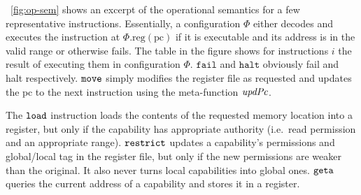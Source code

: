\documentclass[acmsmall,review]{acmart}\settopmatter{printfolios=true}
\newcommand{\update}[2]{[#1 \mapsto #2]}
\newcommand{\sem}[1]{\left\llbracket #1 \right\rrbracket}
\newcommand{\var}[1]{\mathit{#1}}
\newcommand{\lv}{\var{r}}
\newcommand{\gl}{\var{g}}
\newcommand{\pcreg}{\mathrm{pc}}
\newcommand{\addr}{\var{a}}
\newcommand{\start}{\var{b}}
\newcommand{\addrend}{\var{e}}
\newcommand{\perm}{\var{perm}}
\newcommand{\permp}{\var{permPair}}
\newcommand{\stdcap}[1][(\perm,\gl)]{\left(#1,\start,\addrend,\addr \right)}
\newcommand{\plainproj}[1]{\mathrm{#1}}
\newcommand{\memreg}[1][\Phi]{#1.\plainproj{reg}}
\newcommand{\updateHeap}[3][\Phi]{#1\update{\plainproj{mem}.#2}{#3}}
\newcommand{\updateReg}[3][\Phi]{#1\update{\plainproj{reg}.#2}{#3}}
\newcommand{\plainfun}[2]{
  \ifthenelse{\equal{#2}{}}
  {\mathit{#1}}
  {\mathit{#1}(#2)}
}
\newcommand{\updatePcPerm}[1]{\plainfun{updPcPerm}{#1}}
\newcommand{\stdUpdatePc}[1]{\plainfun{updPc}{#1}}
\newcommand{\refreg}[1]{#1}
\newcommand{\refheap}[1]{#1}
\newcommand{\zinstr}[1]{\mathtt{#1}}
\newcommand{\fail}{\zinstr{fail}}
\newcommand{\halt}{\zinstr{halt}}
\newcommand{\oneinstr}[2]{
  \ifthenelse{\equal{#2}{}}
  {\zinstr{#1}}
  {\zinstr{#1} \; #2}
}
\newcommand{\jmp}[1]{\oneinstr{jmp}{#1}}
\newcommand{\twoinstr}[3]{
  \ifthenelse{\equal{#2#3}{}}
  {\zinstr{#1}}
  {\zinstr{#1} \; #2 \; #3}
}
\newcommand{\restricttwo}[2]{\twoinstr{restrict}{#1}{#2}}
\newcommand{\geta}[2]{\twoinstr{geta}{#1}{#2}}
\newcommand{\move}[2]{\twoinstr{move}{#1}{#2}}
\newcommand{\store}[2]{\twoinstr{store}{#1}{#2}}
\newcommand{\load}[2]{\twoinstr{load}{#1}{#2}}
\newcommand{\plainperm}[1]{\textsc{#1}}
\newcommand{\readwrite}{\plainperm{rw}}
\newcommand{\rwx}{\plainperm{rwx}}
\newcommand{\readwritel}{\plainperm{rwl}}
\newcommand{\rwlx}{\plainperm{rwlx}}
\newcommand{\plainlocality}[1]{\mathrm{#1}}
\newcommand{\local}{\plainlocality{local}}
\begin{document}

\figurename~\ref{fig:op-sem} shows an excerpt of the operational semantics for a
few representative instructions. Essentially, a configuration $\Phi$ either
decodes and executes the instruction at $\memreg(\pcreg)$ if it is executable
and its address is in the valid range or otherwise fails. The table in the
figure shows for instructions $i$ the result of executing them in configuration
$\Phi$. $\fail$ and $\halt$ obviously fail and halt respectively. $\move{}{}$
simply modifies the register file as requested and updates the $\pcreg$ to the
next instruction using the meta-function $\stdUpdatePc{}$.

The $\load{}{}$ instruction loads the contents of the requested memory location
into a register, but only if the capability has appropriate authority (i.e.\
read permission and an appropriate range). $\restricttwo{}{}$ updates a
capability's permissions and global/local tag in the register file, but only if
the new permissions are weaker than the original. It also never turns local
capabilities into global ones. $\geta{}{}$ queries the current address of a
capability and stores it in a register.
\end{document}
